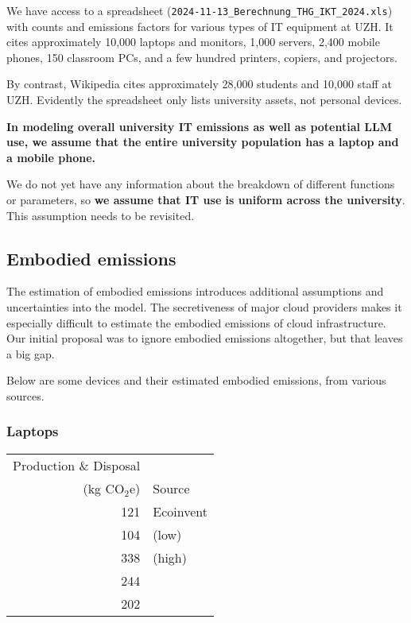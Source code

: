 \documentclass[11pt]{article}
\newcommand{\assumption}[1]{{\bf #1}}
\begin{document}
We have access to a spreadsheet (\texttt{2024-11-13\_Berechnung\_THG\_IKT\_2024.xls}) with
counts and emissions factors for various types of IT equipment at UZH. It cites approximately
10,000 laptops and monitors, 1,000 servers, 2,400 mobile phones,  150 classroom PCs, and a few
hundred printers, copiers, and projectors.

By contrast, Wikipedia \parencite{wikiuzh} cites approximately 28,000 students and 10,000 staff
at UZH. Evidently the spreadsheet only lists university assets, not personal devices.

\assumption{In modeling overall university IT emissions as well as potential LLM use,
we assume that the entire university population has a laptop and a mobile phone.}

We do not yet have any information about the breakdown of different functions or parameters, so
\assumption{we assume that IT use is uniform across the university}. This assumption needs to be
revisited.

\subsection*{Embodied emissions}
The estimation of embodied emissions introduces additional assumptions and uncertainties into
the model. The secretiveness of major cloud providers makes it especially difficult
to estimate the embodied emissions of cloud infrastructure. Our initial proposal was to ignore
embodied emissions altogether, but that leaves a big gap.

Below are some devices and their estimated embodied emissions, from various sources.

\subsubsection*{Laptops}

\begin{table}[h]
\centering
\begin{tabular}{|r|l|}
\hline
Production \& Disposal & \\
(kg CO$_2$e) & Source \\ \hline
121 & Ecoinvent  \\ \hline
104 & \textcite{teehan2013} (low) \\ \hline
338 & \textcite{teehan2013} (high) \\ \hline
244 & \textcite{rarecoil} \\ \hline
202 & \textcite{unctadder2024} \\ \hline
\end{tabular}
\label{tab:embodied_emissions:laptops}
\end{table}
\end{document}
